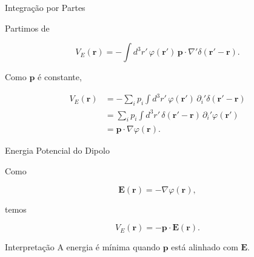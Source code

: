 \documentclass[aspectratio=169]{beamer}
\begin{document}
\begin{frame}{Integração por Partes}

Partimos de

\begin{equation}
V_E(\mathbf r)
=
-\int d^3r'\,\varphi(\mathbf r')\,
\mathbf p\cdot \nabla'\delta(\mathbf r'-\mathbf r).
\end{equation}

Como \(\mathbf p\) é constante,

\begin{align}
V_E(\mathbf r)
&=
-\sum_i p_i \int d^3r'\,
\varphi(\mathbf r')\,
\partial_i'\delta(\mathbf r'-\mathbf r)
\\[0.2cm]
&=
\sum_i p_i \int d^3r'\,
\delta(\mathbf r'-\mathbf r)\,
\partial_i'\varphi(\mathbf r')
\\[0.2cm]
&=
\mathbf p\cdot \nabla \varphi(\mathbf r).
\end{align}

\end{frame}

\begin{frame}{Energia Potencial do Dipolo}

Como

\begin{equation}
\mathbf E(\mathbf r)
=
-\nabla \varphi(\mathbf r),
\end{equation}

temos

\begin{eqbox}
\begin{equation}
V_E(\mathbf r)
=
-\mathbf p\cdot \mathbf E(\mathbf r).
\tag{4.26}
\label{eq:4.26}
\end{equation}
\end{eqbox}

\begin{mybox}{Interpretação}
A energia é mínima quando \(\mathbf p\) está alinhado com \(\mathbf E\).
\end{mybox}

\end{frame}
\end{document}
